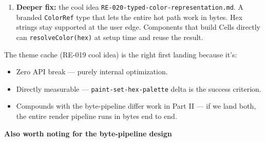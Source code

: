 \begin{enumerate}
\item
  \textbf{Deeper fix:} the cool idea \texttt{R\allowbreak{}E\allowbreak{}-\allowbreak{}0\allowbreak{}2\allowbreak{}0\allowbreak{}-\allowbreak{}t\allowbreak{}y\allowbreak{}p\allowbreak{}e\allowbreak{}d\allowbreak{}-\allowbreak{}c\allowbreak{}o\allowbreak{}l\allowbreak{}o\allowbreak{}r\allowbreak{}-\allowbreak{}r\allowbreak{}e\allowbreak{}p\allowbreak{}r\allowbreak{}e\allowbreak{}s\allowbreak{}e\allowbreak{}n\allowbreak{}t\allowbreak{}a\allowbreak{}t\allowbreak{}i\allowbreak{}o\allowbreak{}n\allowbreak{}.\allowbreak{}m\allowbreak{}d}. A branded \texttt{C\allowbreak{}o\allowbreak{}l\allowbreak{}o\allowbreak{}r\allowbreak{}R\allowbreak{}e\allowbreak{}f} type that lets the entire hot path work in bytes. Hex strings stay supported at the user edge. Components that build Cells directly can \texttt{r\allowbreak{}e\allowbreak{}s\allowbreak{}o\allowbreak{}l\allowbreak{}v\allowbreak{}e\allowbreak{}C\allowbreak{}o\allowbreak{}l\allowbreak{}o\allowbreak{}r\allowbreak{}(\allowbreak{}h\allowbreak{}e\allowbreak{}x\allowbreak{})} at setup time and reuse the result.
\end{enumerate}

The theme cache (RE-019 cool idea) is the right first landing because it's:

\begin{itemize}
\tightlist
\item
  Zero API break --- purely internal optimization.
\item
  Directly measurable --- \texttt{p\allowbreak{}a\allowbreak{}i\allowbreak{}n\allowbreak{}t\allowbreak{}-\allowbreak{}s\allowbreak{}e\allowbreak{}t\allowbreak{}-\allowbreak{}h\allowbreak{}e\allowbreak{}x\allowbreak{}-\allowbreak{}p\allowbreak{}a\allowbreak{}l\allowbreak{}e\allowbreak{}t\allowbreak{}t\allowbreak{}e} delta is the success criterion.
\item
  Compounds with the byte-pipeline differ work in Part II --- if we land both, the entire render pipeline runs in bytes end to end.
\end{itemize}

\textbf{Also worth noting for the byte-pipeline design}

